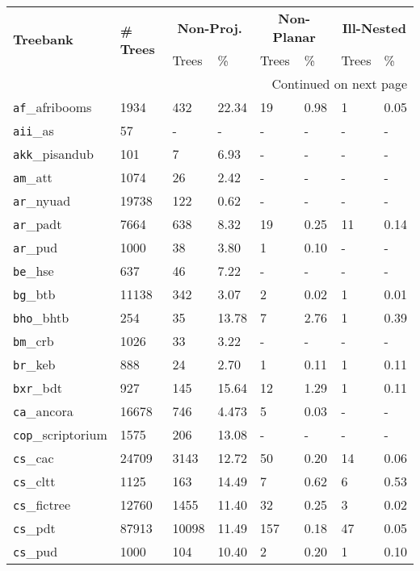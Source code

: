 \begin{longtable}{|l|l|l|l|l|l|l|l|}
    \hline 
    \multirow{2}{*}{\textbf{Treebank}} &
    \multirow{2}{*}{\textbf{\# Trees}} & 
    \multicolumn{2}{c|}{\textbf{Non-Proj.}} & 
    \multicolumn{2}{c|}{\textbf{Non-Planar}} & 
    \multicolumn{2}{c|}{\textbf{Ill-Nested}} \\
     & & Trees & \% & Trees & \% & Trees & \% \\
    \hline 
    \endhead
    \hline 
    \multicolumn{8}{|r|}{{Continued on next page}} \\ 
    \hline
    \endfoot
    \endlastfoot
    \hline
    \label{tab:allnpudv2.5}
\texttt{af}\_afribooms & 1934 & 432 & 22.34 & 19 & 0.98 & 1 & 0.05\\
\texttt{aii}\_as & 57 & - & - & - & - & - & -\\
\texttt{akk}\_pisandub & 101 & 7 & 6.93 & - & - & - & -\\
\texttt{am}\_att & 1074 & 26 & 2.42 & - & - & - & -\\
\texttt{ar}\_nyuad & 19738 & 122 & 0.62 & - & - & - & -\\
\texttt{ar}\_padt & 7664 & 638 & 8.32 & 19 & 0.25 & 11 & 0.14\\
\texttt{ar}\_pud & 1000 & 38 & 3.80 & 1 & 0.10 & - & -\\
\texttt{be}\_hse & 637 & 46 & 7.22 & - & - & - & -\\
\texttt{bg}\_btb & 11138 & 342 & 3.07 & 2 & 0.02 & 1 & 0.01\\
\texttt{bho}\_bhtb & 254 & 35 & 13.78 & 7 & 2.76 & 1 & 0.39\\
\texttt{bm}\_crb & 1026 & 33 & 3.22 & - & - & - & -\\
\texttt{br}\_keb & 888 & 24 & 2.70 & 1 & 0.11 & 1 & 0.11\\
\texttt{bxr}\_bdt & 927 & 145 & 15.64 & 12 & 1.29 & 1 & 0.11\\
\texttt{ca}\_ancora & 16678 & 746 & 4.473 & 5 & 0.03 & - & -\\
\texttt{cop}\_scriptorium & 1575 & 206 & 13.08 & - & - & - & -\\
\texttt{cs}\_cac & 24709 & 3143 & 12.72 & 50 & 0.20 & 14 & 0.06\\
\texttt{cs}\_cltt & 1125 & 163 & 14.49 & 7 & 0.62 & 6 & 0.53\\
\texttt{cs}\_fictree & 12760 & 1455 & 11.40 & 32 & 0.25 & 3 & 0.02\\
\texttt{cs}\_pdt & 87913 & 10098 & 11.49 & 157 & 0.18 & 47 & 0.05\\
\texttt{cs}\_pud & 1000 & 104 & 10.40 & 2 & 0.20 & 1 & 0.10\\

\end{longtable}
